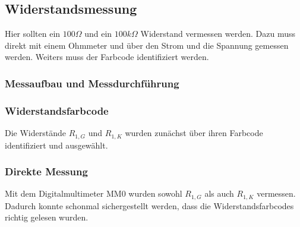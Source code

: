 \documentclass[a4paper]{article}
\begin{document}
\subsection{Widerstandsmessung}
Hier sollten ein $100\unit{\Omega}$ und ein $100 \unit{k\Omega}$ Widerstand vermessen werden.
Dazu muss direkt mit einem Ohmmeter und über den Strom und die Spannung gemessen
werden. Weiters muss der Farbcode identifiziert werden.

\subsubsection{Messaufbau und Messdurchführung}
\subsubsection*{\textbf{Widerstandsfarbcode}}
Die Widerstände $R_{1,G}$ und $R_{1,K}$ wurden zunächst über ihren Farbcode identifiziert und ausgewählt.

\subsubsection*{Direkte Messung}
Mit dem Digitalmultimeter MM0 wurden sowohl $R_{1,G}$ als auch $R_{1,K}$ vermessen.
Dadurch konnte schonmal sichergestellt werden, dass die Widerstandsfarbcodes richtig
gelesen wurden.
\end{document}

